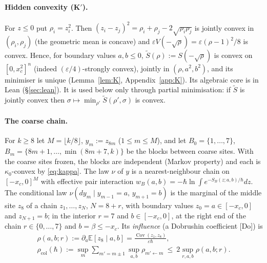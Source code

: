 \documentclass[11pt,a4paper]{article}
\theoremstyle{definition}
\theoremstyle{remark}
\newcommand{\E}{\mathbb{E}}
\newcommand{\Cov}{\operatorname{Cov}}
\newcommand{\xc}{x_c}
\newcommand{\rcol}{\rho_{\mathrm{col}}}
\begin{document}
\paragraph{Hidden convexity (K$'$).} For $z\le0$ put $\rho_i=z_i^2$. Then $(z_i-z_j)^2=\rho_i+\rho_j-2\sqrt{\rho_i\rho_j}$ is jointly convex in $(\rho_i,\rho_j)$ (the geometric mean is concave) and $\varepsilon V(-\sqrt\rho)=\varepsilon(\rho-1)^2/8$ is convex. Hence, for boundary values $a,b\le0$, $\tilde S(\rho):=S(-\sqrt\rho)$ is convex on $[0,\xc^2]^n$ (indeed $(\varepsilon/4)$-strongly convex), jointly in $(\rho,a^2,b^2)$, and its minimiser is unique (Lemma~\ref{lem:K}, Appendix~\ref{app:K}). Its algebraic core is in Lean (\S\ref{sec:lean}). It is used below only through partial minimisation: if $\tilde S$ is jointly convex then $\sigma\mapsto\min_{\rho'}\tilde S(\rho',\sigma)$ is convex.

\paragraph{The coarse chain.} For $k\ge8$ let $M=\lfloor k/8\rfloor$, $y_m:=z_{8m}$ ($1\le m\le M$), and let $B_0=\{1,\dots,7\}$, $B_m=\{8m+1,\dots,\min(8m+7,k)\}$ be the blocks between coarse sites. With the coarse sites frozen, the blocks are independent (Markov property) and each is $\kappa_0$-convex by \eqref{eq:kappa}. The law $\nu$ of $y$ is a nearest-neighbour chain on $[-\xc,0]^M$ with effective pair interaction $w_B(a,b)=-\hbar\ln\int e^{-S_B(z;a,b)/\hbar}dz$. The conditional law $\nu(dy_m\mid y_{m-1}=a,\,y_{m+1}=b)$ is the marginal of the middle site $z_8$ of a chain $z_1,\dots,z_N$, $N=8+r$, with boundary values $z_0=a\in[-\xc,0]$ and $z_{N+1}=b$; in the interior $r=7$ and $b\in[-\xc,0]$, at the right end of the chain $r\in\{0,\dots,7\}$ and $b=\beta\le-\xc$. Its \emph{influence} (a Dobrushin coefficient [Do]) is
\begin{gather*}
\rho(a,b;r):=\partial_a\E[z_8\mid a,b]=\frac{\Cov(z_1,z_8)}{\varepsilon\hbar},\\
\rcol(\hbar):=\sup_m\sum_{m'=m\pm1}\sup_{a,b}\rho_{m'\leftarrow m}\ \le\ 2\sup_{r,a,b}\rho(a,b;r).
\end{gather*}
\end{document}

